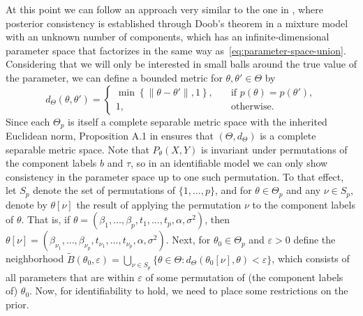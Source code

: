 \documentclass{article}
\numberwithin{equation}{section}
\theoremstyle{plain}
\theoremstyle{definition}
\renewcommand{\epsilon}{\varepsilon}
\begin{document}
At this point we can follow an approach very similar to the one in \citet{miller2023consistency}, where posterior consistency is established through Doob's theorem in a mixture model with an unknown number of components, which has an infinite-dimensional parameter space that factorizes in the same way as~\eqref{eq:parameter-space-union}. Considering that we will only be interested in small balls around the true value of the parameter, we can define a bounded metric for \(\theta, \theta' \in \Theta\) by
\begin{equation}\label{eq:metric-doob}
  d_\Theta(\theta, \theta')= \begin{cases}
    \min \left\{\|\theta - \theta'\|, 1\right\}, \quad & \text{if } p(\theta)=p(\theta'), \\
    1, \quad                                           & \text{otherwise}.
  \end{cases}
\end{equation}
Since each \(\Theta_p\) is itself a complete separable metric space with the inherited Euclidean norm, Proposition A.1 in \citet{miller2023consistency} ensures that \((\Theta, d_\Theta)\) is a complete separable metric space. Note that \(P_\theta(X,Y)\) is invariant under permutations of the component labels \(b\) and \(\tau\), so in an identifiable model we can only show consistency in the parameter space up to one such permutation. To that effect, let \(S_p\) denote the set of permutations of \(\{1,\dots,p\}\), and for \(\theta \in \Theta_p\) and any \(\nu\in S_p\), denote by \(\theta[\nu]\) the result of applying the permutation \(\nu\) to the component labels of \(\theta\). That is, if \(\theta=(\beta_1,\dots,\beta_p, t_1,\dots, t_p,\alpha,\sigma^2)\), then \(\theta[\nu]=(\beta_{\nu_1},\dots,\beta_{\nu_p}, t_{\nu_1},\dots, t_{\nu_p},\alpha,\sigma^2)\). Next, for \(\theta_0\in\Theta_p\) and \(\epsilon>0\) define the neighborhood \(\tilde{B}(\theta_0, \epsilon)  =\bigcup_{\nu\in S_p} \{\theta \in \Theta: d_\Theta(\theta_0[\nu], \theta) < \epsilon \}\), which consists of all parameters that are within \(\epsilon\) of some permutation of (the component labels of) \(\theta_0\). Now, for identifiability to hold, we need to place some restrictions on the prior.
\end{document}
